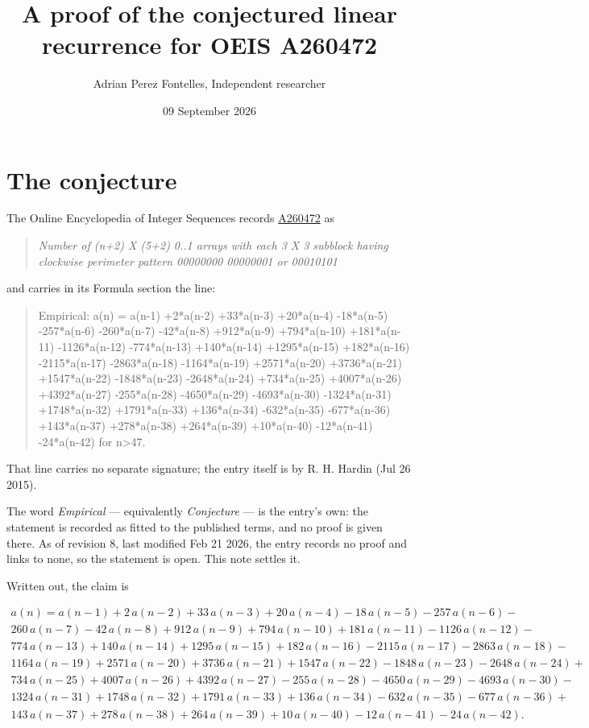 \documentclass[11pt]{article}
\title{A proof of the conjectured linear recurrence for OEIS A260472}
\author{Adrian Perez Fontelles, Independent researcher}
\date{09 September 2026}
\theoremstyle{definition}
\begin{document}
\maketitle
\section{The conjecture}

The Online Encyclopedia of Integer Sequences records \href{https://oeis.org/A260472}{A260472} as

\begin{quote}\itshape Number of (n+2) X (5+2) 0..1 arrays with each 3 X 3 subblock having clockwise perimeter pattern 00000000 00000001 or 00010101\end{quote}

and carries in its Formula section the line:

\begin{quote}\ttfamily Empirical: a(n) = a(n-1) +2*a(n-2) +33*a(n-3) +20*a(n-4) -18*a(n-5) -257*a(n-6) -260*a(n-7) -42*a(n-8) +912*a(n-9) +794*a(n-10) +181*a(n-11) -1126*a(n-12) -774*a(n-13) +140*a(n-14) +1295*a(n-15) +182*a(n-16) -2115*a(n-17) -2863*a(n-18) -1164*a(n-19) +2571*a(n-20) +3736*a(n-21) +1547*a(n-22) -1848*a(n-23) -2648*a(n-24) +734*a(n-25) +4007*a(n-26) +4392*a(n-27) -255*a(n-28) -4650*a(n-29) -4693*a(n-30) -1324*a(n-31) +1748*a(n-32) +1791*a(n-33) +136*a(n-34) -632*a(n-35) -677*a(n-36) +143*a(n-37) +278*a(n-38) +264*a(n-39) +10*a(n-40) -12*a(n-41) -24*a(n-42) for n>47.\end{quote}

That line carries no separate signature; the entry itself is by R. H. Hardin (Jul 26 2015).

The word {\itshape Empirical} --- equivalently {\itshape Conjecture} --- is the entry's own: the statement is recorded as fitted to the published terms, and no proof is given there. As of revision 8, last modified Feb 21 2026, the entry records no proof and links to none, so the statement is open. This note settles it.

Written out, the claim is

\begin{multline*} a(n) = a(n-1) + 2\,a(n-2) + 33\,a(n-3) + 20\,a(n-4) - 18\,a(n-5) - 257\,a(n-6) - \\ 260\,a(n-7) - 42\,a(n-8) + 912\,a(n-9) + 794\,a(n-10) + 181\,a(n-11) - 1126\,a(n-12) - \\ 774\,a(n-13) + 140\,a(n-14) + 1295\,a(n-15) + 182\,a(n-16) - 2115\,a(n-17) - 2863\,a(n-18) - \\ 1164\,a(n-19) + 2571\,a(n-20) + 3736\,a(n-21) + 1547\,a(n-22) - 1848\,a(n-23) - 2648\,a(n-24) + \\ 734\,a(n-25) + 4007\,a(n-26) + 4392\,a(n-27) - 255\,a(n-28) - 4650\,a(n-29) - 4693\,a(n-30) - \\ 1324\,a(n-31) + 1748\,a(n-32) + 1791\,a(n-33) + 136\,a(n-34) - 632\,a(n-35) - 677\,a(n-36) + \\ 143\,a(n-37) + 278\,a(n-38) + 264\,a(n-39) + 10\,a(n-40) - 12\,a(n-41) - 24\,a(n-42). \end{multline*}
\end{document}
